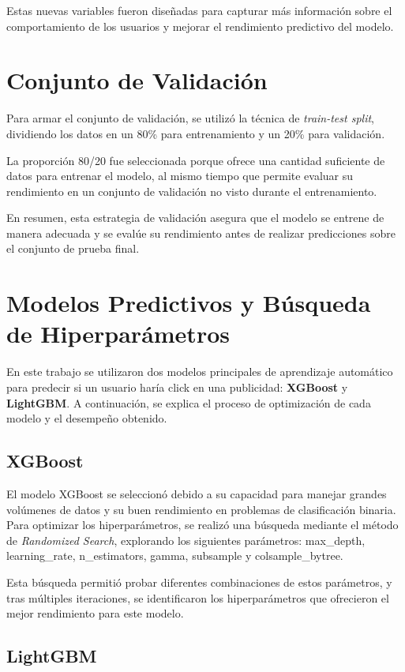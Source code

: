 \documentclass[a4paper,11pt]{article}
\begin{document}
Estas nuevas variables fueron diseñadas para capturar más información sobre el comportamiento de los usuarios y mejorar el rendimiento predictivo del modelo.

\section{Conjunto de Validación}

Para armar el conjunto de validación, se utilizó la técnica de \textit{train-test split}, dividiendo los datos en un 80\% para entrenamiento y un 20\% para validación.

La proporción 80/20 fue seleccionada porque ofrece una cantidad suficiente de datos para entrenar el modelo, al mismo tiempo que permite evaluar su rendimiento en un conjunto de validación no visto durante el entrenamiento.

En resumen, esta estrategia de validación asegura que el modelo se entrene de manera adecuada y se evalúe su rendimiento antes de realizar predicciones sobre el conjunto de prueba final.


\section{Modelos Predictivos y Búsqueda de Hiperparámetros}

En este trabajo se utilizaron dos modelos principales de aprendizaje automático para predecir si un usuario haría click en una publicidad: \textbf{XGBoost} y \textbf{LightGBM}. A continuación, se explica el proceso de optimización de cada modelo y el desempeño obtenido.

\subsection{XGBoost}

El modelo XGBoost se seleccionó debido a su capacidad para manejar grandes volúmenes de datos y su buen rendimiento en problemas de clasificación binaria. Para optimizar los hiperparámetros, se realizó una búsqueda mediante el método de \textit{Randomized Search}, explorando los siguientes parámetros: max_depth, learning_rate, n_estimators, gamma, subsample y colsample_bytree.

Esta búsqueda permitió probar diferentes combinaciones de estos parámetros, y tras múltiples iteraciones, se identificaron los hiperparámetros que ofrecieron el mejor rendimiento para este modelo.

\subsection{LightGBM}
\end{document}
